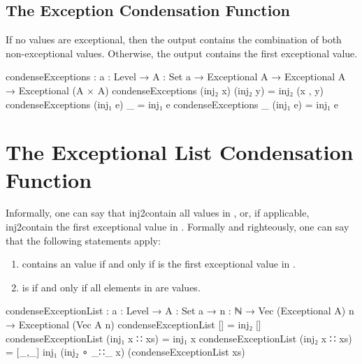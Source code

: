 \documentclass{report}
\begin{document}
\subsection{The Exception Condensation Function}
If no values are exceptional, then the output contains the combination of both non-exceptional values.  Otherwise, the output contains the first exceptional value.

\begin{code}
condenseExceptions : {a : Level} →
                     {A : Set a} →
                     Exceptional A →
                     Exceptional A →
                     Exceptional (A × A)
condenseExceptions (inj₂ x) (inj₂ y) = inj₂ (x , y)
condenseExceptions (inj₁ e) _ = inj₁ e
condenseExceptions _ (inj₁ e) = inj₁ e
\end{code}

\section{The Exceptional List Condensation Function}
Informally, one can say that   \gls{inj2contain} all values in , or, if applicable,   \gls{inj2contain} the first exceptional value in .  Formally and righteously, one can say that the following statements apply:

\begin{enumerate}
  \item {}  contains an  value if and only if   is the first exceptional value in .\label{enum:condenseExceptionList-inj1}
  \item {}  is   if and only if all elements in  are  values.\label{enum:condenseExceptionList-inj2}
\end{enumerate}

\begin{code}
condenseExceptionList :
  {a : Level} →
  {A : Set a} →
  {n : ℕ} →
  Vec (Exceptional A) n →
  Exceptional (Vec A n)
condenseExceptionList [] = inj₂ []
condenseExceptionList (inj₁ x ∷ xs) = inj₁ x
condenseExceptionList (inj₂ x ∷ xs) =
  [_,_] inj₁ (inj₂ ∘ _∷_ x) (condenseExceptionList xs)
\end{code}
\end{document}
